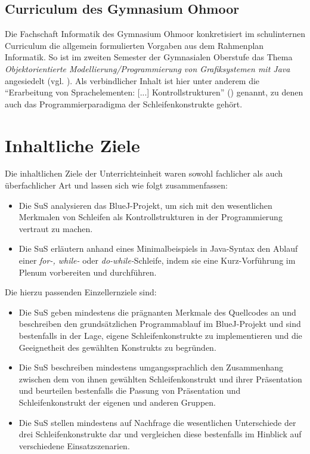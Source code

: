 \documentclass[paper=a4, DIV=13, BCOR=12mm, twoside=on, onecolumn=on, open = any, titlepage =on, parskip =half-, headsepline = on, footsepline = on, chapterprefix = on, sectionprefix = on, appendixprefix = off, fontsize = 12pt, numbers = noenddot, abstract = off]{scrreprt}
\begin{document}
\par \singlespacing
\subsection{Curriculum des Gymnasium Ohmoor}
\onehalfspacing
Die Fachschaft Informatik des Gymnasium Ohmoor konkretisiert im schulinternen Curriculum die allgemein formulierten Vorgaben aus dem Rahmenplan Informatik. So ist im zweiten Semester der Gymnasialen Oberstufe das Thema \textit{Objektorientierte Modellierung/Programmierung von Grafiksystemen mit Java} angesiedelt (vgl. \cite[S.6f.]{ohmoor:16}). Als verbindlicher Inhalt ist hier unter anderem die "`Erarbeitung von Sprachelementen: [...] Kontrollstrukturen"' (\cite[S.7]{ohmoor:16}) genannt, zu denen auch das Programmierparadigma der Schleifenkonstrukte gehört.

\par \singlespacing
 \section{Inhaltliche Ziele}
\onehalfspacing
Die inhaltlichen Ziele der Unterrichteinheit waren sowohl fachlicher als auch überfachlicher Art und lassen sich wie folgt zusammenfassen:
\begin{itemize}
\item Die SuS analysieren das BlueJ-Projekt, um sich mit den wesentlichen Merkmalen von Schleifen als Kontrollstrukturen in der Programmierung vertraut zu machen.
\item Die SuS erläutern anhand eines Minimalbeispiels in Java-Syntax den Ablauf einer \emph{for-, while-} oder \emph{do-while-}Schleife, indem sie eine Kurz-Vorführung im Plenum vorbereiten und durchführen.
\end{itemize}
Die hierzu passenden Einzellernziele sind:
\begin{itemize}
\item Die SuS geben mindestens die prägnanten Merkmale des Quellcodes an und beschreiben den grundsätzlichen Programmablauf im BlueJ-Projekt und sind bestenfalls in der Lage, eigene Schleifenkonstrukte zu implementieren und die Geeignetheit des gewählten Konstrukts zu begründen.
\item Die SuS beschreiben mindestens umgangssprachlich den Zusammenhang zwischen dem von ihnen gewählten Schleifenkonstrukt und ihrer Präsentation und beurteilen bestenfalls die Passung von Präsentation und Schleifenkonstrukt der eigenen und anderen Gruppen.
\item Die SuS stellen mindestens auf Nachfrage die wesentlichen Unterschiede der drei Schleifenkonstrukte dar und vergleichen diese bestenfalls im Hinblick auf verschiedene Einsatzszenarien.
\end{itemize}
\end{document}
